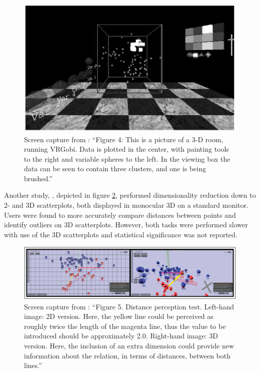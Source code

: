 \documentclass{monashthesis}
\begin{document}
\begin{figure}

{\centering \includegraphics[width=0.7\linewidth]{./figures/nelson98fig} 

}

\caption{Screen capture from \textcite{nelson_xgobi_1998}:
``Figure 4: This is a picture of a 3-D room, running VRGobi. Data is
plotted in the center, with painting tools to the right and variable
spheres to the left. In the viewing box the data can be seen to contain
three clusters, and one is being brushed.''}\label{fig:nelson98fig}
\end{figure}

Another study, \textcite{gracia_new_2016}, depicted in figure
\ref{fig:gracia16fig}, performed dimensionality reduction down to 2- and
3D scatterplots, both displayed in monocular 3D on a standard monitor.
Users were found to more accurately compare distances between points and
identify outliers on 3D scatterplots. However, both tasks were performed
slower with use of the 3D scatterplots and statistical significance was
not reported.









\begin{figure}

{\centering \includegraphics[width=0.7\linewidth]{./figures/gracia16fig} 

}

\caption{Screen capture from \textcite{gracia_new_2016}:
``Figure 5. Distance perception test. Left-hand image: 2D version. Here,
the yellow line could be perceived as roughly twice the length of the
magenta line, thus the value to be introduced should be approximately
2.0. Right-hand image: 3D version. Here, the inclusion of an extra
dimension could provide new information about the relation, in terms of
distances, between both lines.''}\label{fig:gracia16fig}
\end{figure}
\end{document}
